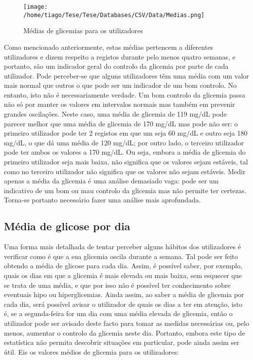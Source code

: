 \begin{figure}[H]
\centering
\texttt{[image: /home/tiago/Tese/Tese/Databases/CSV/Data/Medias.png]}
\caption{Médias de glicemias para os utilizadores}
\label{fig:medias1}
\end{figure}
Como mencionado anteriormente, estas médias pertencem a diferentes utilizadores e dizem respeito a registos durante pelo menos quatro semanas, e portanto, são um indicador geral do controlo da glicemia por parte de cada utilizador. Pode perceber-se que alguns utilizadores têm uma média com um valor mais normal que outros o que pode ser um indicador de um bom controlo. No entanto, isto não é necessariamente verdade. Um bom controlo da glicemia passa não só por manter os valores em intervalos normais mas também em prevenir grandes oscilações. Neste caso, uma média de glicemia de 119 mg/dL pode parecer melhor que uma média de glicemia de 170 mg/dL mas pode não ser: o primeiro utilizador pode ter 2 registos em que um seja 60 mg/dL e outro seja 180 mg/dL, o que dá uma média de 120 mg/dL; por outro lado, o terceiro utilizador pode ter ambos os valores a 170 mg/dL. Ou seja, embora a média de glicemia do primeiro utilizador seja mais baixa, não significa que os valores sejam estáveis, tal como no terceiro utilizador não significa que os valores não sejam estáveis. Medir apenas a média da glicemia é uma análise demasiado vaga: pode ser um indicativo de um bom ou mau controlo da glicemia mas não permite ter certezas. Torna-se portanto necessário fazer uma análise mais aprofundada.



\subsection{Média de glicose por dia}

Uma forma mais detalhada de tentar perceber alguns hábitos dos utilizadores é verificar como é que a sua glicemia oscila durante a semana. Tal pode ser feito obtendo a média de glicose para cada dia. Assim, é possível saber, por exemplo, quais os dias em que a glicemia é mais elevada ou mais baixa, sem esquecer que se trata de uma média, e que por isso não é possível ter conhecimento sobre eventuais hipo ou hiperglicemias. Ainda assim, ao saber a média de glicemia por cada dia, será possível avisar o utilizador de quais os dias a ter em atenção, isto é, se a segunda-feira for um dia com uma média elevada de glicemia, então o utilizador pode ser avisado deste facto para tomar as medidas necessárias ou, pelo menos, aumentar o controlo da glicemia neste dia. Portanto, embora este tipo de estatística não permita descobrir situações em particular, pode ainda assim ser útil. Eis os valores médios de glicemia para os utilizadores:\newline

